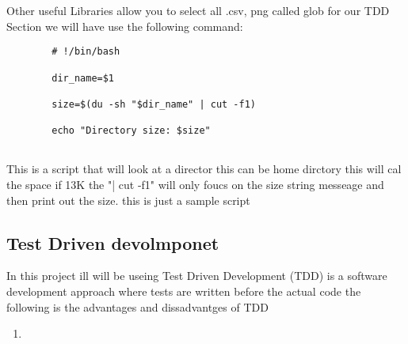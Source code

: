 	Other useful Libraries allow you to  select all  .csv, png  called glob
	for our TDD Section we will have  use the  following command:
	\label{TDD sample bash}
	\begin{verbatim}
		# !/bin/bash

		dir_name=$1

		size=$(du -sh "$dir_name" | cut -f1)

		echo "Directory size: $size"
 
	\end{verbatim}
	This is a script that will look at a  director this can be home dirctory  this will cal the  space if 13K
	the "| cut -f1" will only foucs on the  size string messeage and then print out the  size. this is  just  a sample  script 
	\subsection{Test Driven devolmponet}
	In this  project ill will be useing  Test Driven Development (TDD) is a software development approach where tests are written before the actual code
	the following is the advantages and dissadvantges of TDD
	\begin{enumerate}
		\item 
	\end{enumerate}

